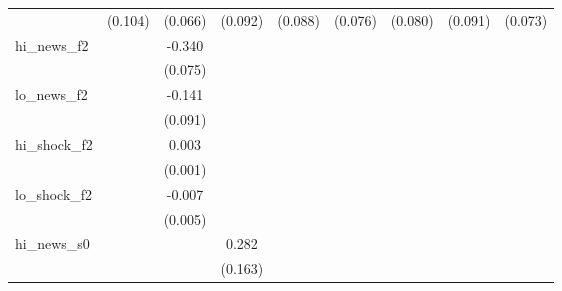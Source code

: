 {\begin{tabular}{l*{8}{c}}
            &     (0.104)         &     (0.066)         &     (0.092)         &     (0.088)         &     (0.076)         &     (0.080)         &     (0.091)         &     (0.073)         \\
\addlinespace
hi\_news\_f2  &                     &      -0.340\sym{***}&                     &                     &                     &                     &                     &                     \\
            &                     &     (0.075)         &                     &                     &                     &                     &                     &                     \\
\addlinespace
lo\_news\_f2  &                     &      -0.141         &                     &                     &                     &                     &                     &                     \\
            &                     &     (0.091)         &                     &                     &                     &                     &                     &                     \\
\addlinespace
hi\_shock\_f2 &                     &       0.003\sym{*}  &                     &                     &                     &                     &                     &                     \\
            &                     &     (0.001)         &                     &                     &                     &                     &                     &                     \\
\addlinespace
lo\_shock\_f2 &                     &      -0.007         &                     &                     &                     &                     &                     &                     \\
            &                     &     (0.005)         &                     &                     &                     &                     &                     &                     \\
\addlinespace
hi\_news\_s0  &                     &                     &       0.282\sym{*}  &                     &                     &                     &                     &                     \\
            &                     &                     &     (0.163)         &                     &                     &                     &                     &                     \\

\end{tabular}}
